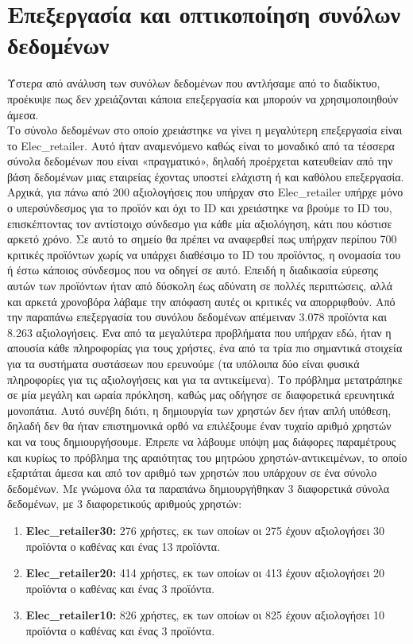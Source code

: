 \section{Επεξεργασία και οπτικοποίηση συνόλων δεδομένων} \label{data_proc}
\noindent Ύστερα από ανάλυση των συνόλων δεδομένων που αντλήσαμε από το διαδίκτυο, προέκυψε πως δεν χρειάζονται κάποια επεξεργασία και μπορούν να χρησιμοποιηθούν άμεσα.\\
\noindent Το σύνολο δεδομένων στο οποίο χρειάστηκε να γίνει η μεγαλύτερη επεξεργασία είναι το Elec\_retailer. Αυτό ήταν αναμενόμενο καθώς είναι το μοναδικό από τα τέσσερα σύνολα δεδομένων που είναι «πραγματικό», δηλαδή προέρχεται κατευθείαν από την βάση δεδομένων μιας εταιρείας έχοντας υποστεί ελάχιστη ή και καθόλου επεξεργασία. Αρχικά, για πάνω από 200 αξιολογήσεις που υπήρχαν στο Elec\_retailer υπήρχε μόνο ο υπερσύνδεσμος για το προϊόν και όχι το ID και χρειάστηκε να βρούμε το ID του, επισκέπτοντας τον αντίστοιχο σύνδεσμο για κάθε μία αξιολόγηση, κάτι που κόστισε αρκετό χρόνο. Σε αυτό το σημείο θα πρέπει να αναφερθεί πως υπήρχαν περίπου 700 κριτικές προϊόντων χωρίς να υπάρχει διαθέσιμο το ID του προϊόντος, η ονομασία του ή έστω κάποιος σύνδεσμος που να οδηγεί σε αυτό. Επειδή η διαδικασία εύρεσης αυτών των προϊόντων ήταν από δύσκολη έως αδύνατη σε πολλές περιπτώσεις, αλλά και αρκετά χρονοβόρα λάβαμε την απόφαση αυτές οι κριτικές να απορριφθούν. Από την παραπάνω επεξεργασία του συνόλου δεδομένων απέμειναν 3.078 προϊόντα και 8.263 αξιολογήσεις. Ένα από τα μεγαλύτερα προβλήματα που υπήρχαν εδώ, ήταν η απουσία κάθε πληροφορίας για τους χρήστες, ένα από τα τρία πιο σημαντικά στοιχεία για τα συστήματα συστάσεων που ερευνούμε (τα υπόλοιπα δύο είναι φυσικά πληροφορίες για τις αξιολογήσεις και για τα αντικείμενα). Το πρόβλημα μετατράπηκε σε μία μεγάλη και ωραία πρόκληση, καθώς μας οδήγησε σε διαφορετικά ερευνητικά μονοπάτια. Αυτό συνέβη διότι, η δημιουργία των χρηστών δεν ήταν απλή υπόθεση, δηλαδή δεν θα ήταν επιστημονικά ορθό να επιλέξουμε έναν τυχαίο αριθμό χρηστών και να τους δημιουργήσουμε. Έπρεπε να λάβουμε υπόψη μας διάφορες παραμέτρους και κυρίως το πρόβλημα της αραιότητας του μητρώου χρηστών-αντικειμένων, το οποίο εξαρτάται άμεσα και από τον αριθμό των χρηστών που υπάρχουν σε ένα σύνολο δεδομένων. Με γνώμονα όλα τα παραπάνω δημιουργήθηκαν 3 διαφορετικά σύνολα δεδομένων, με 3 διαφορετικούς αριθμούς χρηστών:
\begin{enumerate}
	\item \textbf{Elec\_retailer30:} 276 χρήστες, εκ των οποίων οι 275 έχουν αξιολογήσει 30 προϊόντα ο καθένας και ένας 13 προϊόντα.
		\vspace{-2.50mm}
	\item \textbf{Elec\_retailer20:} 414 χρήστες, εκ των οποίων οι 413 έχουν αξιολογήσει 20 προϊόντα ο καθένας και ένας 3 προϊόντα.
		\vspace{-2.50mm}
	\item \textbf{Elec\_retailer10:}	826 χρήστες, εκ των οποίων οι 825 έχουν αξιολογήσει 10 προϊόντα ο καθένας και ένας 3 προϊόντα.
\end{enumerate}
